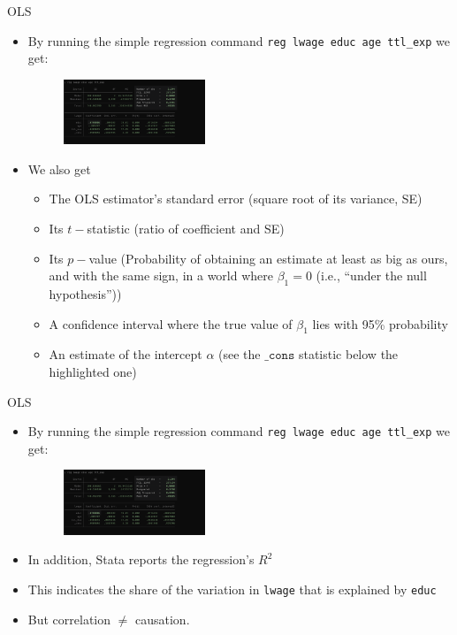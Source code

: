 \documentclass[11pt,notes=hide,aspectratio=169,mathserif]{beamer}
\begin{document}
\begin{frame}{OLS}
    \begin{itemize}
        \item By running the simple regression command \texttt{reg lwage educ age ttl\_exp} we get:  
        \begin{figure}
            \centering
            \includegraphics[width=0.4\textwidth]{inputs/reg1.png}
        \end{figure}
        \item We also get 
        \begin{itemize}
        \item The OLS estimator's standard error (square root of its variance, SE)
        \item Its $t-$statistic (ratio of coefficient and SE)
        \item Its $p-$value (Probability of obtaining an estimate at least as big as ours, and with the same sign, in a world where $\beta_1=0$ (i.e., ``under the null hypothesis''))
        \item A confidence interval where the true value of $\beta_1$ lies with 95\% probability
        \item An estimate of the intercept $\alpha$ (see the $\texttt{\_cons}$ statistic below the highlighted one)
        \end{itemize}
    \end{itemize}
\end{frame}

\begin{frame}{OLS}
    \begin{itemize}
        \item By running the simple regression command \texttt{reg lwage educ age ttl\_exp} we get:  
        \begin{figure}
            \centering
            \includegraphics[width=0.4\textwidth]{inputs/reg1.png}
        \end{figure}
        \item In addition, Stata reports the regression's $R^2$
        \item This indicates the share of the variation in \texttt{lwage} that is explained by \texttt{educ}
        \item But correlation $\neq$ causation.
        \end{itemize}
\end{frame}
\end{document}
